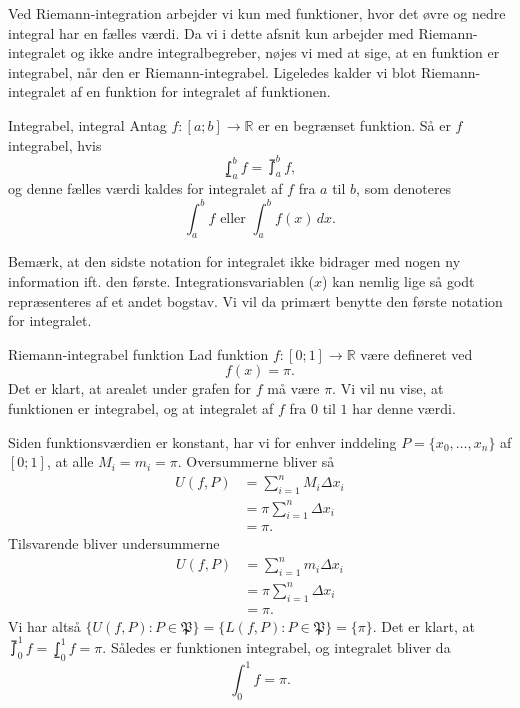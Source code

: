Ved Riemann-integration arbejder vi kun med funktioner, hvor det øvre og nedre integral har en fælles værdi.
Da vi i dette afsnit kun arbejder med Riemann-integralet og ikke andre integralbegreber, nøjes vi med at sige, at en funktion er integrabel, når den er Riemann-integrabel.
Ligeledes kalder vi blot Riemann-integralet af en funktion for integralet af funktionen.

\begin{definition}[label=def:integrabel]{Integrabel, integral}{}
  Antag $f:[a;b] \to \mathbb{R}$ er en begrænset funktion. 
  Så er $f$ integrabel, hvis
  \[
  \lowint_{a}^{b} f = \upint_{a}^{b} f,   
  \] 
  og denne fælles værdi kaldes for integralet af $f$ fra $a$ til $b$, som denoteres 
  \[
  \int_{a}^{b} f \text{ eller }  \int_{a}^{b} f(x) \,dx.
  \] 
\end{definition}

Bemærk, at den sidste notation for integralet ikke bidrager med nogen ny information ift. den første.
 Integrationsvariablen ($x$) kan nemlig lige så godt repræsenteres af et andet bogstav.
Vi vil da primært benytte den første notation for integralet.

\begin{example}[label=exa:Riemann-integrabel]{Riemann-integrabel funktion}{}
  Lad funktion $f:[0; 1] \to \mathbb{R}$ være defineret ved
  \[
  f(x)=\pi.
  \]
  Det er klart, at arealet under grafen for $f$ må være $\pi $.
  Vi vil nu vise, at funktionen er integrabel, og at integralet af $f$ fra $0$ til $1$ har denne værdi.

  Siden funktionsværdien er konstant, har vi for enhver inddeling $P=\{ x_0, \ldots , x_n \} $ af $[0;1]$, at alle $M_i=m_i=\pi $.
  Oversummerne bliver så
  \begin{equation*}
  \begin{split}
    U(f, P)&=\sum_{i=1}^{n} M_i \Delta x_i \\
    &= \pi \sum_{i=1}^{n} \Delta x_i \\
    &= \pi.
  \end{split}
  \end{equation*}
Tilsvarende bliver undersummerne
  \begin{equation*}
  \begin{split}
    U(f, P)&=\sum_{i=1}^{n} m_i \Delta x_i \\
    &= \pi \sum_{i=1}^{n} \Delta x_i \\
    &= \pi.
  \end{split}
  \end{equation*}
  Vi har altså $\{ U(f, P):P \in \mathfrak{P}\} =\{ L(f, P):P \in \mathfrak{P} \} =\{ \pi  \} $. 
  Det er klart, at $\upint_{0}^{1} f = \lowint_{0}^{1} f =\pi $.
  Således er funktionen integrabel, og integralet bliver da
  \[
  \int_{0}^{1} f = \pi. 
  \] 
\end{example}


